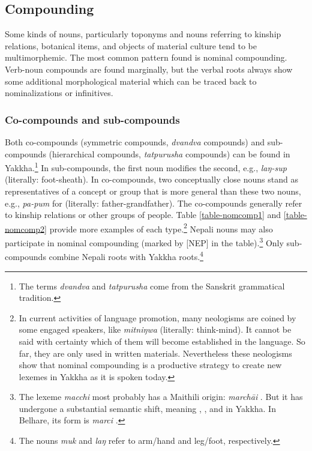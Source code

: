 \subsection{Compounding}\label{lex-noun-2}

Some kinds of nouns, particularly toponyms and nouns referring to kinship relations, botanical items, and objects of material culture tend to be multimorphemic. The most common pattern found is nominal compounding. Verb-noun compounds are found marginally, but the verbal roots always show some  additional morphological material which can be traced back to nominalizations or infinitives. 

\subsubsection{Co-compounds and sub-compounds}

Both co-compounds (symmetric compounds, \emph{dvandva} compounds) and sub-com\-pounds (hierarchical compounds, \emph{tatpurusha} compounds) can be found in Yakkha.\footnote{The terms \emph{dvandva} and \emph{tatpurusha} come from the Sanskrit grammatical tradition.} In sub-compounds, the first noun modifies the second, e.g., \emph{laŋ-sup}  (literally: foot-sheath). In co-compounds, two conceptually close nouns stand as representatives of a concept or group that is more general than these two nouns, e.g., \emph{pa-pum} for  (literally: father-grandfather). The co-compounds generally refer to kinship relations or other groups of people. Table \ref{table-nomcomp1} and \ref{table-nomcomp2} provide more examples of each type.\footnote{In current activities of language promotion, many neologisms are coined by some engaged speakers, like \emph{mitniŋwa}  (literally: think-mind). It cannot be said with certainty which of them will become established in the language. So far, they are only used in written materials. Nevertheless these neologisms show that nominal compounding is a productive strategy to create new lexemes in Yakkha as it is spoken today.} Nepali nouns may also participate in nominal compounding (marked by [NEP] in the table).\footnote{The lexeme \emph{macchi} most probably has a Maithili origin: \emph{marchāi} . But it has undergone a substantial semantic shift, meaning , , and  in Yakkha. In Belhare, its form is \emph{marci} \citep{Bickel1997Dictionary}.} Only sub-compounds combine Nepali roots with Yakkha roots.\footnote{The nouns \emph{muk} and \emph{laŋ} refer to arm/hand  and leg/foot, respectively.}

